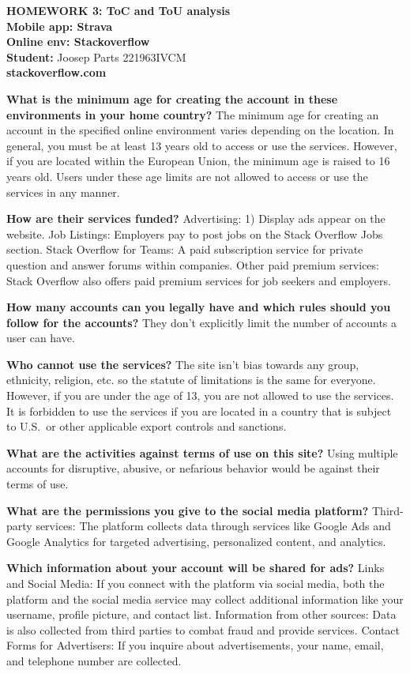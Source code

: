 \textbf{HOMEWORK 3: ToC and ToU analysis}\\
\textbf{Mobile app: Strava}\\
\textbf{Online env: Stackoverflow}\\
\textbf{Student:} Joosep Parts 221963IVCM\\

\textbf{stackoverflow.com}

\textbf{What is the minimum age for creating the account in these environments in your home country?} The minimum age for creating an account in the specified online environment varies depending on the location.
In general, you must be at least 13 years old to access or use the services.
However, if you are located within the European Union, the minimum age is raised to 16 years old.
Users under these age limits are not allowed to access or use the services in any manner.

\textbf{How are their services funded?} Advertising: 1) Display ads appear on the website.
Job Listings: Employers pay to post jobs on
the Stack Overflow Jobs
section.
Stack Overflow for Teams: A paid subscription service for private question and answer forums within companies.
Other paid premium services: Stack Overflow also offers paid premium services for job seekers and employers.

\textbf{How many accounts can you legally have and which rules should you follow for the accounts?} They don't explicitly limit the number of accounts a user can have.

\textbf{Who cannot use the services?} The site isn't bias towards any group, ethnicity, religion, etc.
so the statute of limitations is the same for everyone.
However, if you are under the age of 13, you are not allowed to use the services.
It is forbidden to use the services if you are located in a country that is subject to U.S.\ or other applicable export controls and
sanctions.

\textbf{What are the activities against terms of use on this site?} Using multiple accounts for disruptive, abusive, or nefarious behavior would  be against their terms of use.

\textbf{What are the permissions you give to the social media platform?}
Third-party services: The platform collects data through services like Google Ads and Google Analytics for targeted advertising, personalized content, and analytics.

\textbf{Which information about your account will be shared for ads?}
Links and Social Media: If you connect with the platform via social media, both the platform and the social media service may collect additional information like your username, profile picture, and contact list.
Information from other sources: Data is also collected from third parties to combat fraud and provide services.
Contact Forms for Advertisers: If you inquire about advertisements, your name, email, and telephone number are collected.

